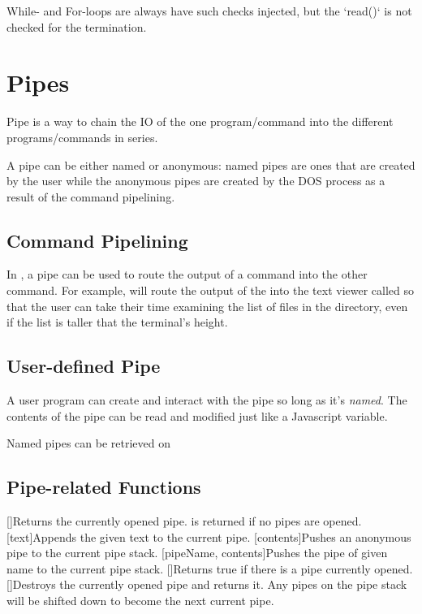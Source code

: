 While- and For-loops are always have such checks injected, but the `read()` is not checked for the termination.


\chapter{Pipes}

Pipe is a way to chain the IO of the one program/command into the different programs/commands in series.

A pipe can be either named or anonymous: named pipes are ones that are created by the user while the anonymous pipes are created by the DOS process as a result of the command pipelining.

\section{Command Pipelining}

In \thedos, a pipe can be used to route the output of a command into the other command. For example,  will route the output of the  into the text viewer called  so that the user can take their time examining the list of files in the directory, even if the list is taller that the terminal's height.

\section{User-defined Pipe}

A user program can create and interact with the pipe so long as it's \emph{named}. The contents of the pipe can be read and modified just like a Javascript variable.

Named pipes can be retrieved on 

\section{Pipe-related Functions}

\begin{outline}
\1[]{Returns the currently opened pipe.  is returned if no pipes are opened.}
\1[text]{Appends the given text to the current pipe.}
\1[contents]{Pushes an anonymous pipe to the current pipe stack.}
\1[pipeName, contents]{Pushes the pipe of given name to the current pipe stack.}
\1[]{Returns true if there is a pipe currently opened.}
\1[]{Destroys the currently opened pipe and returns it. Any pipes on the pipe stack will be shifted down to become the next current pipe.}
\end{outline}


